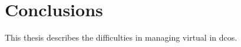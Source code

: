 \chapter{Conclusions}
\label{chap:conclusions}
This thesis describes the difficulties in managing virtual in \gls{dcos}. 

